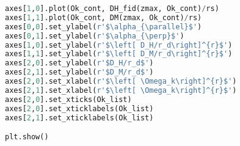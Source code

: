 \begin{lstlisting}[language=python]
axes[1,0].plot(Ok_cont, DH_fid(zmax, Ok_cont)/rs) 
axes[1,1].plot(Ok_cont, DM(zmax, Ok_cont)/rs)
axes[0,0].set_ylabel(r'$\alpha_{\parallel}$')
axes[0,1].set_ylabel(r'$\alpha_{\perp}$')
axes[1,0].set_ylabel(r'$\left[ D_H/r_d\right]^{r}$')
axes[1,1].set_ylabel(r'$\left[ D_M/r_d\right]^{r}$')
axes[2,0].set_ylabel(r'$D_H/r_d$')
axes[2,1].set_ylabel(r'$D_M/r_d$')
axes[2,0].set_xlabel(r'$\left[ \Omega_k\right]^{r}$')
axes[2,1].set_xlabel(r'$\left[ \Omega_k\right]^{r}$')
axes[2,0].set_xticks(Ok_list)
axes[2,0].set_xticklabels(Ok_list)
axes[2,1].set_xticklabels(Ok_list)

plt.show()


\end{lstlisting}
\renewcommand{\baselinestretch}{1.5}



